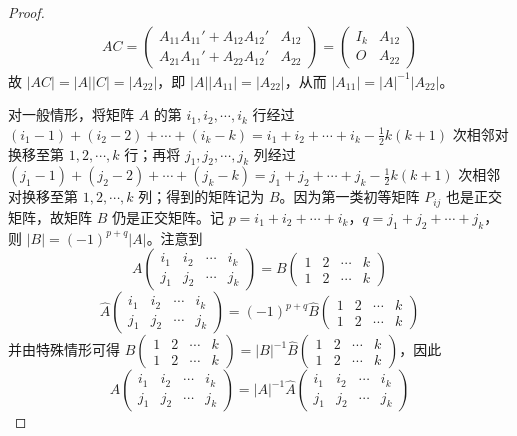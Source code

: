 \documentclass[../../main.tex]{subfiles}%
\begin{document}
\begin{proof}
\begin{align*}
AC = \begin{pmatrix}
A_{11}A_{11}' + A_{12}A_{12}' & A_{12} \\
A_{21}A_{11}' + A_{22}A_{12}' & A_{22}
\end{pmatrix} = \begin{pmatrix}
I_k & A_{12} \\
O & A_{22}
\end{pmatrix}
\end{align*}
故 \(\vert AC\vert = \vert A\vert\vert C\vert = \vert A_{22}\vert\)，即 \(\vert A\vert\vert A_{11}\vert = \vert A_{22}\vert\)，从而 \(\vert A_{11}\vert = \vert A\vert^{-1}\vert A_{22}\vert\)。

对一般情形，将矩阵 \(A\) 的第 \(i_1,i_2,\cdots,i_k\) 行经过 \((i_1 - 1)+(i_2 - 2)+\cdots+(i_k - k)=i_1 + i_2 + \cdots + i_k - \frac{1}{2}k(k + 1)\) 次相邻对换移至第 \(1,2,\cdots,k\) 行；再将 \(j_1,j_2,\cdots,j_k\) 列经过 \((j_1 - 1)+(j_2 - 2)+\cdots+(j_k - k)=j_1 + j_2 + \cdots + j_k - \frac{1}{2}k(k + 1)\) 次相邻对换移至第 \(1,2,\cdots,k\) 列；得到的矩阵记为 \(B\)。因为第一类初等矩阵 \(P_{ij}\) 也是正交矩阵，故矩阵 \(B\) 仍是正交矩阵。记 \(p = i_1 + i_2 + \cdots + i_k\)，\(q = j_1 + j_2 + \cdots + j_k\)，则 \(\vert B\vert = (-1)^{p + q}\vert A\vert\)。注意到
\[A\begin{pmatrix}
i_1 & i_2 & \cdots & i_k \\
j_1 & j_2 & \cdots & j_k
\end{pmatrix} = B\begin{pmatrix}
1 & 2 & \cdots & k \\
1 & 2 & \cdots & k
\end{pmatrix}\]
\[\widehat{A}\begin{pmatrix}
i_1 & i_2 & \cdots & i_k \\
j_1 & j_2 & \cdots & j_k
\end{pmatrix} = (-1)^{p + q}\widehat{B}\begin{pmatrix}
1 & 2 & \cdots & k \\
1 & 2 & \cdots & k
\end{pmatrix}\]
并由特殊情形可得 \(B\begin{pmatrix}
1 & 2 & \cdots & k \\
1 & 2 & \cdots & k
\end{pmatrix} = \vert B\vert^{-1}\widehat{B}\begin{pmatrix}
1 & 2 & \cdots & k \\
1 & 2 & \cdots & k
\end{pmatrix}\)，因此
\[A\begin{pmatrix}
i_1 & i_2 & \cdots & i_k \\
j_1 & j_2 & \cdots & j_k
\end{pmatrix} = \vert A\vert^{-1}\widehat{A}\begin{pmatrix}
i_1 & i_2 & \cdots & i_k \\
j_1 & j_2 & \cdots & j_k
\end{pmatrix}\] 

\end{proof}
\end{document}
